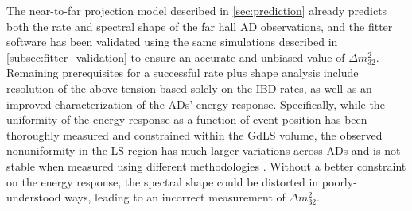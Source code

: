 The near-to-far projection model described in \cref{sec:prediction}
already predicts both the rate and spectral shape
of the far hall AD observations,
and the fitter software has been validated using the same simulations
described in \cref{subsec:fitter_validation}
to ensure an accurate and unbiased value of $\Delta m^2_{32}$.
Remaining prerequisites for a successful rate plus shape analysis
include resolution of the above tension based solely on the IBD rates,
as well as an improved characterization of the ADs' energy response.
Specifically, while the uniformity of the energy response
as a function of event position
has been thoroughly measured and constrained within the GdLS volume,
the observed nonuniformity in the LS region
has much larger variations across ADs
and is not stable when measured using different methodologies \cite{beda_nonuniformity}.
Without a better constraint on the energy response,
the spectral shape could be distorted in poorly-understood ways,
leading to an incorrect measurement of $\Delta m^2_{32}$.
